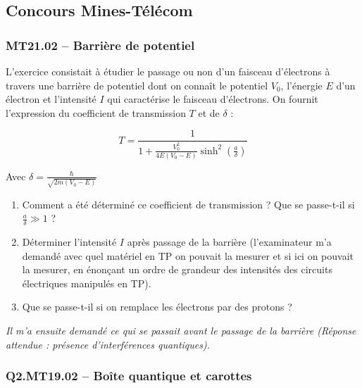 \newpage
\subsection*{Concours Mines-Télécom}

\subsubsection*{MT21.02 -- Barrière de potentiel }

L'exercice consistait à étudier le passage ou non d'un faisceau d'électrons à travers une barrière de potentiel dont on connaît le potentiel $V_{0}$, l'énergie $E$ d'un électron et l'intensité $I$ qui caractérise le faisceau d'électrons. On fournit l'expression du coefficient de transmission $T$ et de $\delta$ :

$$T = \frac{1}{1 + \frac{V_{0}^{2}}{4E(V_{0} - E)}\sinh^{2}(\frac{a}{\delta})}$$

Avec $\delta = \frac{\hbar}{\sqrt{2m(V_{0} - E)}}$

\begin{enumerate}
\item Comment a été déterminé ce coefficient de transmission ? Que se passe-t-il si $\frac{a}{\delta} \gg 1$ ?
\item Déterminer l'intensité $I$ après passage de la barrière (l'examinateur m'a demandé avec quel matériel en TP on pouvait la mesurer et si ici on pouvait la mesurer, en énonçant un ordre de grandeur des intensités des circuits électriques manipulés en TP).
\item Que se passe-t-il si on remplace les électrons par des protons ?


\end{enumerate}

\textit{Il m'a ensuite demandé ce qui se passait avant le passage de la barrière (Réponse attendue : présence d'interférences quantiques).}

\subsubsection*{Q2.MT19.02 -- Boîte quantique et carottes }

